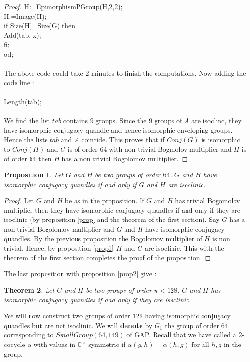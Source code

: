 \documentclass[12pt, reqno]{amsart}
\newtheorem{theorem}{Theorem}[section]
\newtheorem{proposition}[theorem]{Proposition}
\begin{document}
\begin{proof}
H:=EpimorphismPGroup(H,2,2);\\
H:=Image(H);\\
if Size(H)=Size(G) then\\
Add(tab, x);\\
fi;\\
od;\\\\
The above code could take $2$ minutes to finish the computations. Now adding the code line :\\\\
Length(tab);\\\\
We find the list $tab$ contains $9$ groups. Since the $9$ groups of $A$ are isoclinc, they have isomorphic conjugacy quandle and hence isomorphic enveloping groups. Hence the lists $tab$ and $A$ coincide. This proves that if $Conj(G)$ is isomorphic to $Conj(H)$ and $G$ is of order $64$ with non trivial Bogmolov multiplier and $H$ is of order $64$ then $H$ has a non trivial Bogolomov multiplier.
\end{proof}
\begin{proposition}
Let $G$ and $H$ be two groups of order $64$. $G$ and $H$ have isomorphic conjugacy quandles if and only if $G$ and $H$ are isoclinic.
\end{proposition}
\begin{proof}
Let $G$ and $H$ be as in the proposition. If $G$ and $H$ has trivial Bogomolov multiplier then they have isomorphic conjugacy quandles if and only if they are isoclinic (by proposition \ref{prop} and the theorem of the first section). Say $G$ has a non trivial Bogolomov multiplier and $G$ and $H$ have isomorphic conjugacy quandles. By the previous proposition the Bogolomov multiplier of $H$ is non trivial. Hence, by proposition \ref{prop1} $H$ and $G$ are isoclinic. This with the theorem of the first section completes the proof of the proposition.
\end{proof}
The last proposition with proposition \ref{prop2} give :
\begin{theorem}
Let $G$ and $H$ be two groups of order $n<128$. $G$ and $H$ has isomorphic conjugacy quandles if and only if they are isoclinic.
\end{theorem}
We will now construct two groups of order $128$ having isomorphic conjugacy quandles but are not isoclinic. We will \textbf{denote} by $G_1$ the group of order $64$ corresponding to $SmallGroup(64,149)$ of GAP. Recall that we have called a $2$-cocycle $\alpha$ with values in $\mathbb{C}^\times$ symmetric if $\alpha(g,h)=\alpha(h,g)$ for all $h,g$ in the group. 
\end{document}
